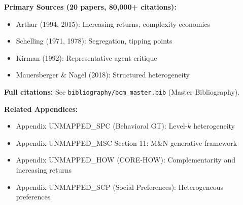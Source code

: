 \textbf{Primary Sources (20 papers, 80,000+ citations):}
\begin{itemize}[nosep]
    \item Arthur (1994, 2015): Increasing returns, complexity economics
    \item Schelling (1971, 1978): Segregation, tipping points
    \item Kirman (1992): Representative agent critique
    \item Mauersberger \& Nagel (2018): Structured heterogeneity
\end{itemize}

\textbf{Full citations:} See \texttt{bibliography/bcm\_master.bib} (Master Bibliography).

\textbf{Related Appendices:}
\begin{itemize}[nosep]
    \item Appendix UNMAPPED_SPC (Behavioral GT): Level-$k$ heterogeneity
    \item Appendix UNMAPPED_MSC Section 11: M\&N generative framework
    \item Appendix UNMAPPED_HOW (CORE-HOW): Complementarity and increasing returns
    \item Appendix UNMAPPED_SCP (Social Preferences): Heterogeneous preferences
\end{itemize}

